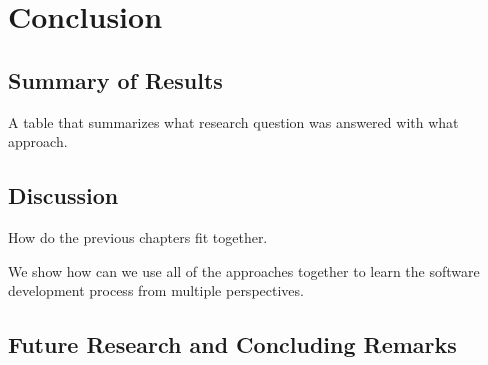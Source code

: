 \chapter{Conclusion}
\label{ch9-conclusion}


\section{Summary of Results}

A table that summarizes what research question was answered with what approach. 

\section{Discussion}

How do the previous chapters fit together. 

We show how can we use all of the approaches together to learn the software development process from multiple perspectives.  

\section{Future Research and Concluding Remarks}

